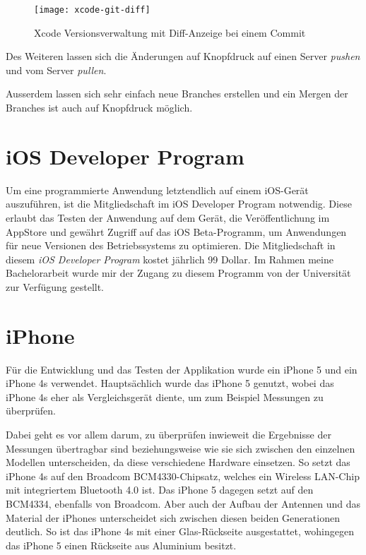\begin{figure}[htb!]
		  \centering
	\texttt{[image: xcode-git-diff]}
	\caption{Xcode Versionsverwaltung mit Diff-Anzeige bei einem Commit}
	\label{xcode-git-diff}
\end{figure}

Des Weiteren lassen sich die Änderungen auf Knopfdruck auf einen Server \emph{pushen} und vom Server \emph{pullen}.

Ausserdem lassen sich sehr einfach neue Branches erstellen und ein Mergen der Branches ist auch auf Knopfdruck möglich.


\section{iOS Developer Program}
\label{sec:iosdevprogram}
Um eine programmierte Anwendung letztendlich auf einem iOS-Gerät auszuführen, ist die Mitgliedschaft im iOS Developer Program notwendig.
Diese erlaubt das Testen der Anwendung auf dem Gerät, die Veröffentlichung im AppStore und gewährt Zugriff auf das iOS Beta-Programm, um Anwendungen für neue Versionen des Betriebssystems zu optimieren.
Die Mitgliedschaft in diesem \emph{iOS Developer Program} kostet jährlich 99 Dollar. 
Im Rahmen meine Bachelorarbeit wurde mir der Zugang zu diesem Programm von der Universität zur Verfügung gestellt.



\section{iPhone}
\label{sec:tools:iphone}
Für die Entwicklung und das Testen der Applikation wurde ein iPhone 5 und ein iPhone 4s verwendet. 
Hauptsächlich wurde das iPhone 5 genutzt, wobei das iPhone 4s eher als Vergleichsgerät diente, um zum Beispiel Messungen zu überprüfen.

Dabei geht es vor allem darum, zu überprüfen inwieweit die Ergebnisse der Messungen übertragbar sind beziehungsweise wie sie sich zwischen den einzelnen Modellen unterscheiden, da diese verschiedene Hardware einsetzen. So setzt das iPhone 4s auf den Broadcom BCM4330-Chipsatz, welches ein Wireless LAN-Chip mit integriertem Bluetooth 4.0 ist. Das iPhone 5 dagegen setzt auf den BCM4334, ebenfalls von Broadcom. 
Aber auch der Aufbau der Antennen und das Material der iPhones unterscheidet sich zwischen diesen beiden Generationen deutlich. 
So ist das iPhone 4s mit einer Glas-Rückseite ausgestattet, wohingegen das iPhone 5 einen Rückseite aus Aluminium besitzt.

